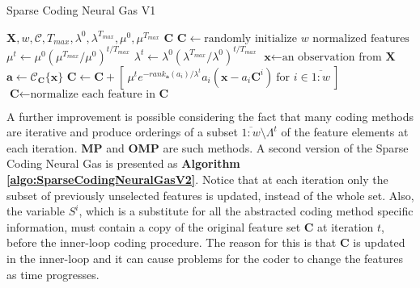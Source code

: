 \documentclass[runningheads,a4paper]{llncs}
\newcommand{\hcrange}[2]{\overline{{#1}\colon\!\!{#2}}}
\begin{document}
\begin{algorithm}[h!]
\caption{Sparse Coding Neural Gas V1}
\label{algo:SparseCodingNeuralGasV1}
\begin{algorithmic}
\Require $\textbf{X},w,\mathcal{C},T_{max},\lambda^0,\lambda^{T_{max}},\mu^0,\mu^{T_{max}}$
\Ensure $\textbf{C}$
\State $\textbf{C} \gets \mbox{randomly initialize $w$ normalized features}$
\For {$t = \hcrange{1}{T_{max}}$}
\State $\mu^t \gets \mu^0 (\mu^{T_{max}} / \mu^0)^{t / T_{max}}$  
\State $\lambda^t \gets \lambda^0 (\lambda^{T_{max}} / \lambda^0)^{t / T_{max}}$ 
\State $\textbf{x} \gets \text{an observation from $\textbf{X}$}$
\State $\textbf{a} \gets \mathcal{C}_{\textbf{C}}\{ \textbf{x} \}$
\State $\textbf{C} \gets \textbf{C} + [ ~ \mu^t e^{-rank_{\textbf{a}}(a_i) / \lambda^t} a_i (\textbf{x} - a_i \textbf{C}^i) ~ \mbox{for $i \in \hcrange{1}{w}$} ~ ]$
\State $\textbf{C} \gets \mbox{normalize each feature in $\textbf{C}$}$
\EndFor
\end{algorithmic}
\end{algorithm}

A further improvement is possible considering the fact that many coding methods are iterative and produce orderings of a subset $\hcrange{1}{w} \setminus \Lambda^t$ of the feature elements at each iteration. \textbf{MP} and \textbf{OMP} are such methods. A second version of the Sparse Coding Neural Gas is presented as \textbf{Algorithm \ref{algo:SparseCodingNeuralGasV2}}. Notice that at each iteration only the subset of previously unselected features is updated, instead of the whole set. Also, the variable $S^i$, which is a substitute for all the abstracted coding method specific information, must contain a copy of the original feature set $\textbf{C}$ at iteration $t$, before the inner-loop coding procedure. The reason for this is that $\textbf{C}$ is updated in the inner-loop and it can cause problems for the coder to change the features as time progresses.
\end{document}
